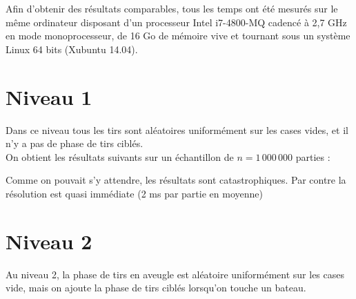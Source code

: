 Afin d'obtenir des résultats comparables, tous les temps ont été mesurés sur le même ordinateur disposant d'un processeur Intel i7-4800-MQ cadencé à 2,7 GHz en mode monoprocesseur, de 16 Go de mémoire vive et tournant sous un système Linux 64 bits (Xubuntu 14.04).

\newpage
\section{Niveau 1}
Dans ce niveau tous les tirs sont aléatoires uniformément sur les cases vides, et il n'y a pas de phase de tirs ciblés.\\
On obtient les résultats suivants sur un échantillon de $n=1\,000\,000$ parties :

\begin{center}
\end{center}

Comme on pouvait s'y attendre, les résultats sont catastrophiques. Par contre la résolution est quasi immédiate (2 ms par partie en moyenne)
\newpage
\section{Niveau 2}
Au niveau 2, la phase de tirs en aveugle est aléatoire uniformément sur les cases vide, mais on ajoute la phase de tirs ciblés lorsqu'on touche un bateau.

